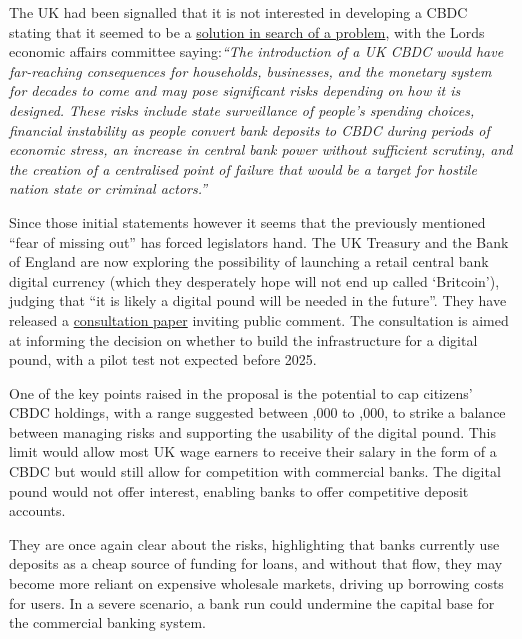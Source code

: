 The UK had been signalled that it is not interested in developing a CBDC stating that it seemed to be a \href{https://committees.parliament.uk/publications/8443/documents/85604/default/}{solution in search of a problem}, with the Lords economic affairs committee saying:\textit{``The introduction of a UK CBDC would have far-reaching consequences for households, businesses, and the monetary system for decades to come and may pose significant risks depending on how it is designed. These risks include state surveillance of people’s spending choices, financial instability as people convert bank deposits to CBDC during periods of economic stress, an increase in central bank power without sufficient scrutiny, and the creation of a centralised point of failure that would be a target for hostile nation state or criminal actors.''}\par
Since those initial statements however it seems that the previously mentioned ``fear of missing out'' has forced legislators hand. The UK Treasury and the Bank of England are now exploring the possibility of launching a retail central bank digital currency (which they desperately hope will not end up called `Britcoin'), judging that ``it is likely a digital pound will be needed in the future''. They have released a \href{https://www.gov.uk/government/news/hm-treasury-and-bank-of-england-consider-plans-for-a-digital-pound}{consultation paper} inviting public comment. The consultation is aimed at informing the decision on whether to build the infrastructure for a digital pound, with a pilot test not expected before 2025.\par
One of the key points raised in the proposal is the potential to cap citizens' CBDC holdings, with a range suggested between ,000 to ,000, to strike a balance between managing risks and supporting the usability of the digital pound. This limit would allow most UK wage earners to receive their salary in the form of a CBDC but would still allow for competition with commercial banks. The digital pound would not offer interest, enabling banks to offer competitive deposit accounts.\par
They are once again clear about the risks, highlighting that banks currently use deposits as a cheap source of funding for loans, and without that flow, they may become more reliant on expensive wholesale markets, driving up borrowing costs for users. In a severe scenario, a bank run could undermine the capital base for the commercial banking system. \par

